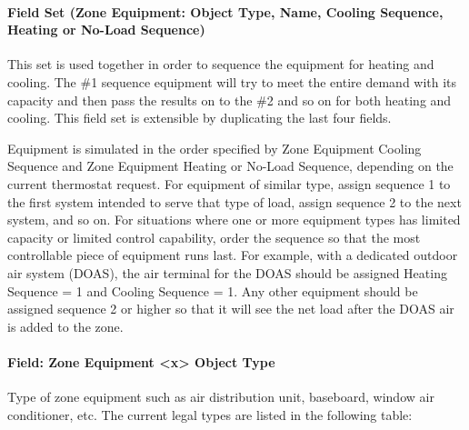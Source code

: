 \paragraph{Field Set (Zone Equipment: Object Type, Name, Cooling Sequence, Heating or No-Load Sequence)}\label{field-set-zone-equipment-object-type-name-cooling-sequence-heating-or-no-load-sequence}

This set is used together in order to sequence the equipment for heating and cooling. The \#1 sequence equipment will try to meet the entire demand with its capacity and then pass the results on to the \#2 and so on for both heating and cooling. This field set is extensible by duplicating the last four fields.

Equipment is simulated in the order specified by Zone Equipment Cooling Sequence and Zone Equipment Heating or No-Load Sequence, depending on the current thermostat request. For equipment of similar type, assign sequence 1 to the first system intended to serve that type of load, assign sequence 2 to the next system, and so on. For situations where one or more equipment types has limited capacity or limited control capability, order the sequence so that the most controllable piece of equipment runs last. For example, with a dedicated outdoor air system (DOAS), the air terminal for the DOAS should be assigned Heating Sequence = 1 and Cooling Sequence = 1. Any other equipment should be assigned sequence 2 or higher so that it will see the net load after the DOAS air is added to the zone.

\paragraph{Field: Zone Equipment \textless{}x\textgreater{} Object Type}\label{field-zone-equipment-x-object-type}

Type of zone equipment such as air distribution unit, baseboard, window air conditioner, etc. The current legal types are listed in the following table:

